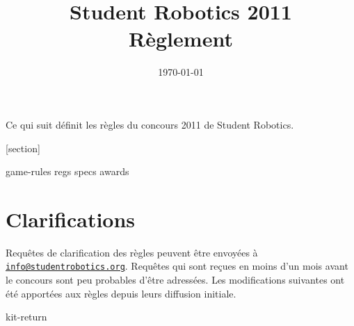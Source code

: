 \documentclass[a4paper, 12pt]{scrartcl}
\title {Student Robotics 2011\\ Règlement}
\date{\today}
\begin{document}
\maketitle

\noindent Ce qui suit définit les règles du concours 2011 de Student Robotics.

[section]
\newcommand{\rcn}{\stepcounter{rule}\arabic{section}.\arabic{rule}}
\renewcommand{\labelenumi}{\rcn}

 {game-rules}
\newpage
 {regs}
\newpage
 {specs}
\newpage
 {awards}

\renewcommand{\labelenumi}{\rcn}

\section{Clarifications}
Requêtes de clarification des règles peuvent être envoyées à \href{mailto:info@studentrobotics.org}{\nolinkurl{info@studentrobotics.org}}. Requêtes qui sont reçues en moins d'un mois avant le concours sont peu probables d'être adressées.
Les modifications suivantes ont été apportées aux règles depuis leurs diffusion initiale.

\newpage
\appendix
\appendixpage
\addappheadtotoc
 {kit-return}
\end{document}

